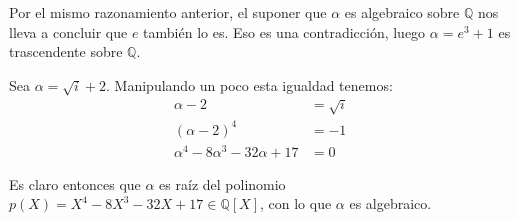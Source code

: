 \documentclass[a4paper, 11pt]{article}
\begin{document}
\begin{solucion}
\begin{apartado}
          Por el mismo razonamiento anterior, el suponer que $\alpha$ es algebraico sobre $\mathbb{Q}$ nos lleva a concluir que $e$ también lo es. Eso es una contradicción, luego $\alpha = e^3+1$ es trascendente sobre $\mathbb{Q}$.
      \end{apartado}

      \begin{apartado}
          Sea $\alpha = \sqrt{i}+2$. Manipulando un poco esta igualdad tenemos:
          \begin{align*}
              \alpha-2 &= \sqrt{i} \\
              (\alpha-2)^4 &= -1 \\
              \alpha^4-8\alpha^3-32\alpha+17 &= 0
          \end{align*}

          Es claro entonces que $\alpha$ es raíz del polinomio $p(X) = X^4-8X^3-32X+17 \in \mathbb{Q}[X]$, con lo que $\alpha$ es algebraico.
      \end{apartado}
  \end{solucion}

  \begin{ejercicio}
  \end{ejercicio}
\end{document}
